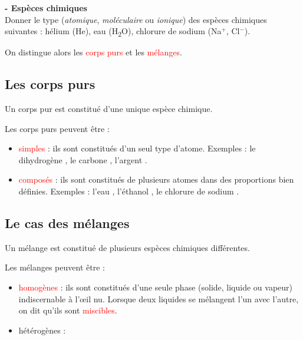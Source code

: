 \begin{mdframed}[style=autreexo]
\textbf{ - Espèces chimiques}\\
Donner le type (\textit{atomique}, \textit{moléculaire} ou \textit{ionique}) des espèces chimiques suivantes : hélium (He), eau (H\textsubscript{2}O), chlorure de sodium (Na$^{+}$, Cl$^{-}$).
\end{mdframed}

On distingue alors les \textcolor{red}{corps purs} et les \textcolor{red}{mélanges}.

\subsection{Les corps purs}
\begin{tcolorbox}[colback=green!5!white,colframe=green!75!black,title=\textbf{Corps purs}]
Un corps pur est constitué d'une unique espèce chimique.
\end{tcolorbox}

Les corps purs peuvent être :

\begin{itemize}
    \item \textcolor{red}{simples} : ils sont constitués d'un seul type d'atome. Exemples : le dihydrogène , le carbone , l'argent .
    \item \textcolor{red}{composés} : ils sont constitués de plusieurs atomes dans des proportions bien définies. Exemples : l'eau , l'éthanol , le chlorure de sodium .
\end{itemize}




%
\subsection{Le cas des mélanges}
\begin{tcolorbox}[colback=green!5!white,colframe=green!75!black,title=\textbf{Mélange}]
Un mélange est constitué de plusieurs espèces chimiques différentes.
\end{tcolorbox}
Les mélanges peuvent être :
\begin{itemize}
    \item \textcolor{red}{homogènes} : ils sont constitués d'une seule phase (solide, liquide ou vapeur) indiscernable à l'\oe il nu. Lorsque deux liquides se mélangent l'un avec l'autre, on dit qu'ils sont \textcolor{red}{miscibles}.
    \item hétérogènes : 
\end{itemize}
